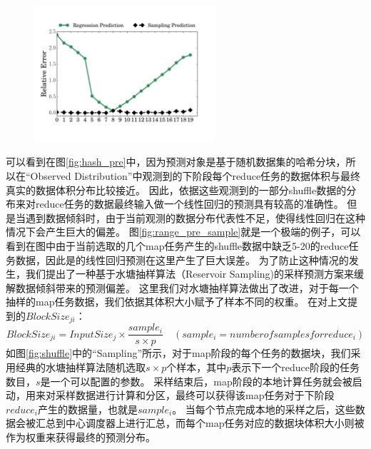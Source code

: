 \begin{figure}[!htp]
    \centering
	\includegraphics[width=0.6\textwidth]{../../PPoPP-2018/fig/prediction_relative_error.pdf}
\end{figure}

可以看到在图\ref{fig:hash_pre}中，因为预测对象是基于随机数据集的哈希分块，所以在“Observed Distribution”中观测到的下阶段每个reduce任务的数据体积与最终真实的数据体积分布比较接近。
因此，依据这些观测到的一部分shuffle数据的分布来对reduce任务的数据最终输入做一个线性回归的预测具有较高的准确性。
但是当遇到数据倾斜时，由于当前观测的数据分布代表性不足，使得线性回归在这种情况下会产生巨大的偏差。
图\ref{fig:range_pre_sample}就是一个极端的例子，可以看到在图中由于当前选取的几个map任务产生的shuffle数据中缺乏5-20的reduce任务数据，因此是的线性回归预测在这里产生了巨大误差。
为了防止这种情况的发生，我们提出了一种基于水塘抽样算法（Reservoir Sampling)\cite{reservoir}的采样预测方案来缓解数据倾斜带来的预测偏差。
这里我们对水塘抽样算法做出了改进，对于每一个抽样的map任务数据，我们依据其体积大小赋予了样本不同的权重。
在对上文提到的$BlockSize_{ji}$：
\begin{equation}
	\label{eq:sample}
	BlockSize_{ji} = {{InputSize_j \times \frac{sample_i}{s \times p}}} \quad (sample_i = number of samples for reduce_i)
\end{equation}
如图\ref{fig:shuffle}中的“Sampling”所示，对于map阶段的每个任务的数据块，我们采用经典的水塘抽样算法随机选取$s \times p$个样本，其中$p$表示下一个reduce阶段的任务数目，$s$是一个可以配置的参数。
采样结束后，map阶段的本地计算任务就会被启动，用来对采样数据进行计算和分区，最终可以获得该map任务对于下阶段$reduce_i$产生的数据量，也就是$sample_i$。
当每个节点完成本地的采样之后，这些数据会被汇总到中心调度器上进行汇总，而每个map任务对应的数据块体积大小则被作为权重来获得最终的预测分布。

